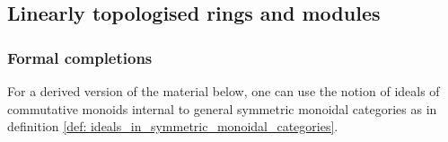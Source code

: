                 \begin{remark} \label{remark: valuative_vs_zariski_topologies}
                    
                \end{remark}
                
        \subsection{Linearly topologised rings and modules}
            \subsubsection{Formal completions}
                \begin{remark}
                    For a derived version of the material below, one can use the notion of ideals of commutative monoids internal to general symmetric monoidal categories as in definition \ref{def: ideals_in_symmetric_monoidal_categories}.
                \end{remark}
            

